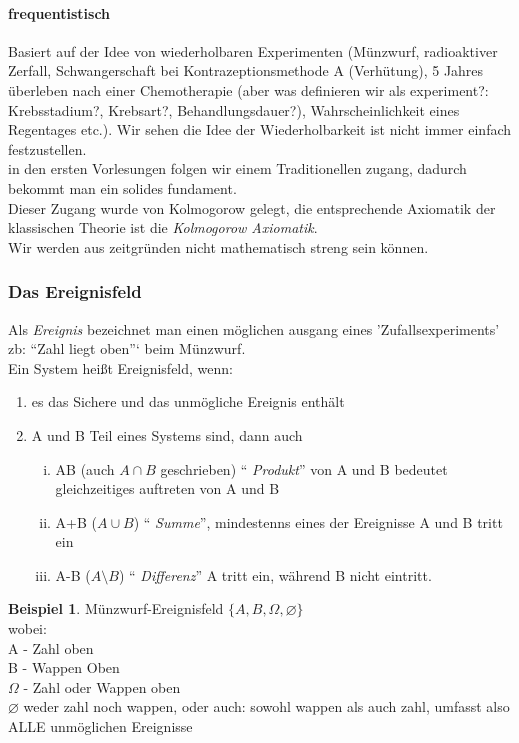 \documentclass[a4paper]{article}
\theoremstyle{definition}
\newtheorem{beispiel}{Beispiel}
\theoremstyle{remark}
\begin{document}
\paragraph{frequentistisch}
\label{par:frequentistisch}
Basiert auf der Idee von wiederholbaren Experimenten (Münzwurf, radioaktiver Zerfall, Schwangerschaft bei Kontrazeptionsmethode A (Verhütung), 5 Jahres überleben nach einer Chemotherapie (aber was definieren wir als experiment?: Krebsstadium?, Krebsart?, Behandlungsdauer?), Wahrscheinlichkeit eines Regentages etc.).
Wir sehen die Idee der Wiederholbarkeit ist nicht immer einfach festzustellen.\\
in den ersten Vorlesungen folgen wir einem Traditionellen zugang, dadurch bekommt man ein solides fundament. \\
Dieser Zugang wurde von Kolmogorow gelegt, die entsprechende Axiomatik der klassischen Theorie ist die \textit{Kolmogorow Axiomatik}.\\
Wir werden aus zeitgründen nicht mathematisch streng sein können.\\

\subsubsection{Das Ereignisfeld}
\label{ssub:das_ereignisfeld}

Als \textit{Ereignis} bezeichnet man einen möglichen ausgang eines 'Zufallsexperiments' zb: ``Zahl liegt oben''` beim Münzwurf.\\
Ein System heißt Ereignisfeld, wenn:
\begin{enumerate}
  \item es das Sichere und das unmögliche Ereignis enthält
  \item A und B Teil eines Systems sind, dann auch 
     \begin{enumerate}[(i)]
       \item AB  (auch $A\cap B$ geschrieben) `` \textit{Produkt}'' von A und B bedeutet gleichzeitiges auftreten von A und B
       \item A+B ($A\cup B$) `` \textit{Summe}'', mindestenns eines der Ereignisse A und B tritt ein
       \item A-B ($A\setminus B$) `` \textit{Differenz}'' A tritt ein, während B nicht eintritt.
     \end{enumerate}
\end{enumerate}
\begin{beispiel}
 Münzwurf-Ereignisfeld $\{A,B,\Omega , \varnothing \}$\\
 wobei:\\
 A - Zahl oben\\
 B - Wappen Oben \\
 $\Omega $ - Zahl oder Wappen oben\\
 $\varnothing$ weder zahl noch wappen, oder auch: sowohl wappen als auch zahl, umfasst also ALLE unmöglichen Ereignisse\\
\end{beispiel}
\end{document}
